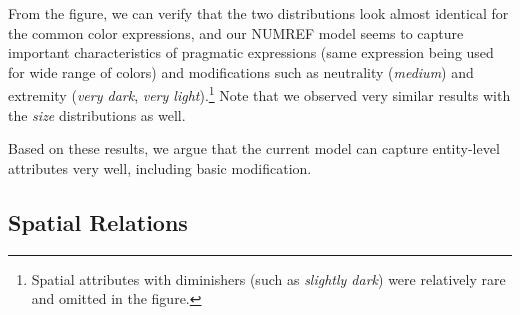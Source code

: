 From the figure, we can verify that the two distributions look almost identical for the common color expressions, and our NUMREF model seems to capture important characteristics of pragmatic expressions (same expression being used for wide range of colors) and modifications such as neutrality (\textit{medium}) and extremity (\textit{very dark}, \textit{very light}).\footnote{Spatial attributes with diminishers (such as \textit{slightly dark}) were relatively rare and omitted in the figure.} Note that we observed very similar results with the \textit{size} distributions as well.

Based on these results, we argue that the current model can capture entity-level attributes very well, including basic modification.

\subsection{Spatial Relations}
\label{05_subsec:spatial_relations}

